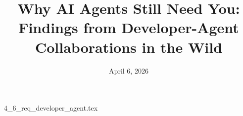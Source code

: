 \documentclass{article}      %
\title{Why AI Agents Still Need You: Findings from Developer-Agent Collaborations in the Wild}  %
\date{April 6, 2026}
\begin{document}

\maketitle                   %



{4_6_req_developer_agent.tex}
\printbibliography
\end{document}

